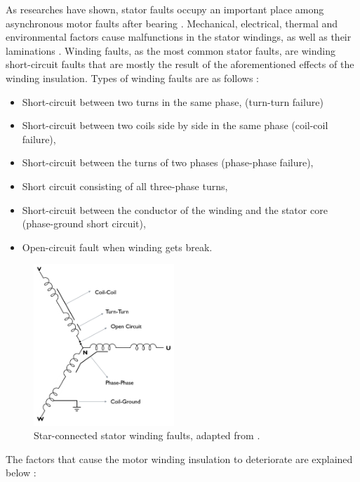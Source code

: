 As researches have shown, stator faults occupy an important place among asynchronous motor faults after bearing \cite{motor1985report,albrecht1986assessment,albrecht1987assessment,thorsen1995survey,bonnett2008increased}. Mechanical, electrical, thermal and environmental factors cause malfunctions in the stator windings, as well as their laminations \cite{karmakar2016induction,Siddique}. Winding faults, as the most common stator faults, are winding short-circuit faults that are mostly the result of the aforementioned effects of the winding insulation. Types of winding faults are as follows \cite{karmakar2016induction,Siddique,lipo}:

\begin{itemize}
	\item Short-circuit between two turns in the same phase, (turn-turn failure)
	\item Short-circuit between two coils side by side in the same phase (coil-coil failure),
	\item Short-circuit between the turns of two phases (phase-phase failure),
	\item Short circuit consisting of all three-phase turns,
	\item Short-circuit between the conductor of the winding and the stator core (phase-ground short circuit),
	\item Open-circuit fault when winding gets break.
\end{itemize}

\begin{figure}[h]
	\centering
	\includegraphics[width=150pt,keepaspectratio=true]{./fig/stator.PNG}
	\caption{Star-connected stator winding faults, adapted from \cite{karmakar2016induction}.}	
	\label{statorwinding}
\end{figure}

The factors that cause the motor winding insulation to deteriorate are explained below \cite{bonnett1999root,karmakar2016induction,Siddique,faiz2017fault}:

